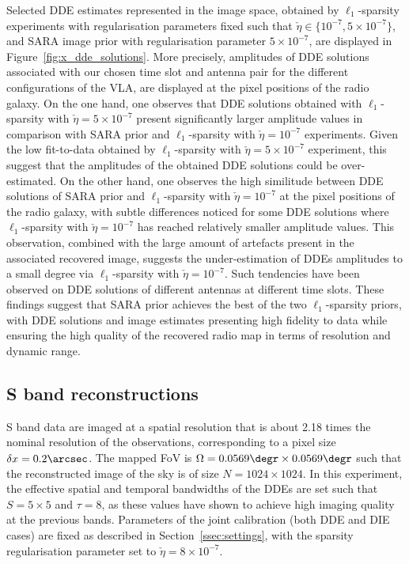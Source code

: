 \documentclass[fleqn,usenatbib]{mnras}
\begin{document}



Selected DDE estimates represented in the image space, obtained by $\ell_1$-sparsity experiments with regularisation parameters fixed such that $\check{\eta} \in\{10^{-7}, 5\times 10^{-7}\}$, and SARA image prior with regularisation parameter $5\times 10^{-7}$, are displayed in Figure~\ref{fig:x_dde_solutions}. More precisely, amplitudes of DDE solutions associated with our chosen time slot and antenna pair for the different configurations of the {{VLA}}, are displayed at the pixel positions of the radio galaxy. On the one hand, one observes that DDE solutions obtained with $\ell_1$-sparsity with $\check{\eta} =5\times 10^{-7}$ present significantly larger amplitude values in comparison with SARA prior and $\ell_1$-sparsity with $\check{\eta} =10^{-7}$ experiments. Given the low fit-to-data obtained by $\ell_1$-sparsity with $\check{\eta} =5\times 10^{-7}$ experiment, this suggest that the amplitudes of the obtained DDE solutions could be over-estimated. On the other hand, one observes the high similitude between DDE solutions of SARA prior and $\ell_1$-sparsity with $\check{\eta} = 10^{-7}$ at the pixel positions of the radio galaxy, with subtle differences noticed for some DDE solutions where $\ell_1$-sparsity with $\check{\eta} =10^{-7}$ has reached relatively smaller amplitude values. This observation, combined with the large amount of artefacts present in the associated recovered image, suggests the under-estimation of DDEs amplitudes to a small degree via $\ell_1$-sparsity with $\check{\eta} =10^{-7}$. 
Such tendencies have been observed on DDE solutions of different antennas at different time slots. These findings suggest that SARA prior achieves the best of the two $\ell_1$-sparsity priors, with DDE solutions and image estimates presenting high fidelity to data while ensuring the high quality of the recovered radio map in terms of resolution and dynamic range.


\subsection{S band reconstructions}%

%
S band data are imaged at a spatial resolution that is about 2.18 times the nominal resolution of the observations, corresponding to a pixel size $\delta x=0.2\arcsec$. The mapped FoV is $\Omega= 0.0569\degr \times 0.0569\degr $ such that the reconstructed image of the sky is of size $N=1024\times 1024$. 
In this experiment, the effective spatial and temporal bandwidths of the DDEs are set such that $S=5\times5$ and $\tau=8$, as these values have shown to achieve high imaging quality at the previous bands. Parameters of the joint calibration (both DDE and DIE cases) are fixed as described in Section~\ref{ssec:settings}, with the sparsity regularisation parameter set to $\check{\eta} =8\times 10^{-7}$.
\end{document}
